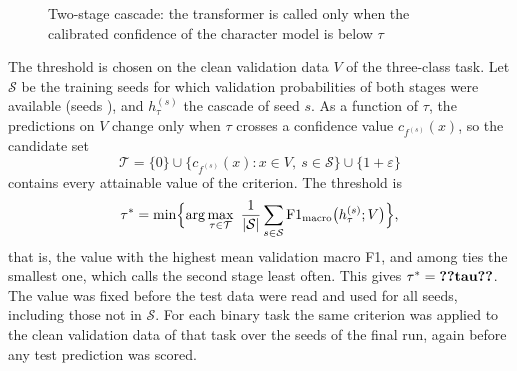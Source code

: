 \begin{figure}[t]
\centering
{}
\caption{Two-stage cascade: the transformer is called only when the calibrated confidence of the character model is below $\tau$}
\label{fig:cascade}
\end{figure}

The threshold is chosen on the clean validation data $V$ of the three-class task. Let $\mathcal{S}$ be the training seeds for which validation probabilities of both stages were available (seeds ), and $h^{(s)}_\tau$ the cascade of seed $s$. As a function of $\tau$, the predictions on $V$ change only when $\tau$ crosses a confidence value $c_{f^{(s)}}(x)$, so the candidate set
\begin{equation}\label{eq:cands}
\mathcal{T}=\{0\}\cup\{c_{f^{(s)}}(x):x\in V,\ s\in\mathcal{S}\}\cup\{1+\varepsilon\}
\end{equation}
contains every attainable value of the criterion. The threshold is
\begin{equation}\label{eq:tau}
\tau^{*}=\min\Bigl\{\arg\max_{\tau\in\mathcal{T}}\ \frac{1}{|\mathcal{S}|}\sum_{s\in\mathcal{S}}\mathrm{F1}_{\mathrm{macro}}\bigl(h^{(s)}_\tau;V\bigr)\Bigr\},
\end{equation}
that is, the value with the highest mean validation macro F1, and among ties the smallest one, which calls the second stage least often. This gives $\tau^{*}=\val{tau}$. The value was fixed before the test data were read and used for all  seeds, including those not in $\mathcal{S}$. For each binary task the same criterion was applied to the clean validation data of that task over the  seeds of the final run, again before any test prediction was scored.

